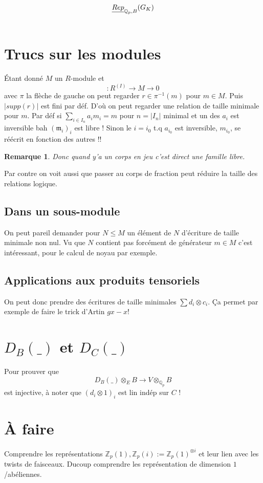 \documentclass[a4paper,12pt]{article}
\title{$\underline{Rep}_{\Q_p,B}(G_K)$}
\date{}
\newcommand{\Z}{\mathbb{Z}}
\newcommand{\Q}{\mathbb{Q}}
\newcommand{\m}{\mathfrak m}
\theoremstyle{plain}
\newtheorem{rem}{Remarque}
\theoremstyle{definition}
\theoremstyle{remark}
\begin{document}
\maketitle

\section{Trucs sur les modules}
Étant donné $M$ un $R$-module et 
\[\colon R^{(I)}\to M\to 0\]
avec $\pi$ la flèche de gauche on peut regarder
$r\in \pi^{-1}(m)$ pour $m\in M$. Puis $|supp(r)|$
est fini par déf. D'où on peut regarder une relation
de taille minimale pour $m$. Par déf si 
$\sum_{i\in I_n} a_i m_i=m$ pour $n=|I_n|$ minimal
et un des $a_i$ est inversible bah $(\m_i)_i$ est libre ! 
Sinon le $i=i_0$ t.q $a_{i_0}$ est inversible, $m_{i_0}$,
se réécrit en fonction des autres !!

\begin{rem}
  Donc quand y'a un corps en jeu c'est direct une famille
  libre.
\end{rem}
Par contre on voit aussi que passer au corps de fraction peut
réduire la taille des relations logique.

\subsection{Dans un sous-module}
On peut pareil demander pour $N\leq M$ un élément de $N$
d'écriture de taille minimale non nul. Vu que $N$ contient pas
forcément de générateur $m\in M$ c'est intéressant, pour le 
calcul de noyau par exemple.

\subsection{Applications aux produits tensoriels}
On peut donc prendre des écritures de taille minimales
$\sum d_i\otimes c_i$. Ça permet par exemple de faire
le trick d'Artin $gx-x$!


\section{$D_B(\_)$ et $D_C(\_)$}
Pour prouver que \[D_B(\_)\otimes_{E}B\to V\otimes_{\Q_p}B\]
est injective, à noter que $(d_i\otimes 1)_i$ est lin indép
sur $C$ !

\section{À faire}
Comprendre les représentations $\Z_p(1), \Z_p(i):=\Z_p(1)^{\otimes i}$
et leur lien avec les twists de faisceaux. Ducoup comprendre les 
représentation de dimension $1$/abéliennes.
\end{document}
